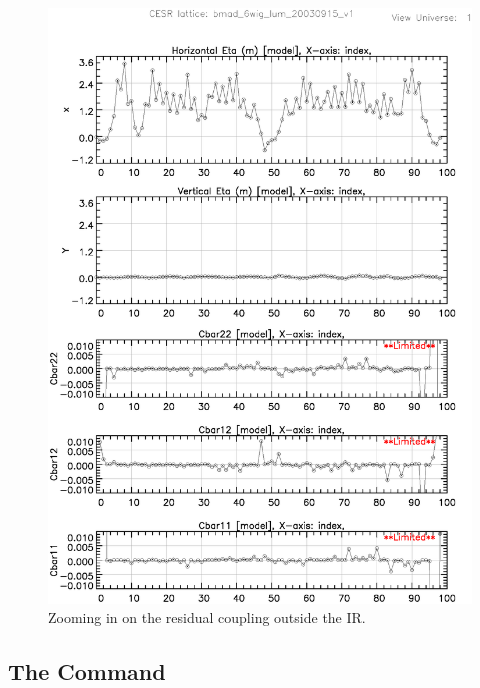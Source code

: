 \begin{figure}
  \centering
  \includegraphics[width=5in]{plot_coupling_no_IR.eps}
  \caption{Zooming in on the residual coupling outside the IR.}
  \label{f:plot_coupling_no_IR}
\end{figure}

\subsection{The  Command}

